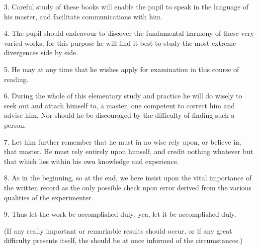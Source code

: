 3. Careful study of these books will enable the pupil to speak in the language of his master, and facilitate communications with him.

4. The pupil should endeavour to discover the fundamental harmony of these very varied works; for this purpose he will find it best to study the most extreme divergences side by side.

5. He may at any time that he wishes apply for examination in this course of reading.

6. During the whole of this elementary study and practice he will do wisely to seek out and attach himself to, a master, one competent to correct him and advise him. Nor should he be discouraged by the difficulty of finding such a person.

7. Let him further remember that he must in no wise rely upon, or believe in, that master. He must rely entirely upon himself, and credit nothing whatever but that which lies within his own knowledge and experience.

8. As in the beginning, so at the end, we here insist upon the vital importance of the written record as the only possible check upon error derived from the various qualities of the experimenter.

9. Thus let the work be accomplished duly; yea, let it be accomplished duly.

(If any really important or remarkable results should occur, or if any great difficulty presents itself, the \Argentium{} should be at once informed of the circumstances.)
